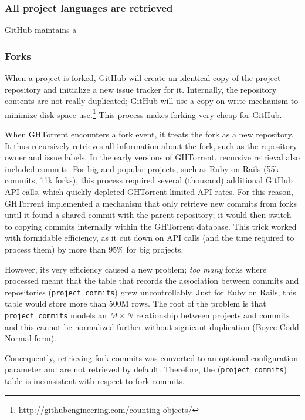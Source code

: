 \documentclass{sig-alternate}
\begin{document}
\subsubsection{All project languages are retrieved}
GitHub maintains a 


\subsubsection{Forks}

When a project is forked, GitHub will create an identical copy of the project
repository and initialize a new issue tracker for it. Internally, the repository
contents are not really duplicated; GitHub will use a copy-on-write
mechanism to minimize disk space use.\footnote{http://githubengineering.com/counting-objects/} This process makes forking very cheap for GitHub.

When GHTorrent encounters a fork event, it treats the fork as a new repository.
It thus recursively retrieves all information about the fork, such as the
repository owner and issue labels. In the early versions of
GHTorrent, recursive retrieval also included commits. For big and popular
projects, such as Ruby on Rails (55k commits, 11k forks),
this process required several (thousand) additional GitHub API calls, which
quickly depleted GHTorrent limited API rates. For this reason, GHTorrent implemented a mechanism that only retrieve new commits from forks until
it found a shared commit with the parent repository; it would then switch
to copying commits internally within the GHTorrent database. This trick worked
with formidable efficiency, as it cut down on API calls (and the time required
to process them) by more than 95\% for big projects.

However, its very efficiency caused a new problem; \emph{too many} forks where
processed meant that the table that records the association between commits and
repositories (\texttt{project\_\-commits}) grew uncontrollably. Just for Ruby on
Rails, this table would store more than 500M rows. The root of the problem
is that \texttt{project\_commits} models an $M \times N$ relationship between
projects and commits and this cannot be normalized further without signicant
duplication (Boyce-Codd Normal form).

Concequently, retrieving fork commits was converted to an optional
configuration parameter and are not retrieved by default. Therefore, the
(\texttt{project\_\-commits}) table is inconsistent with respect to
fork commits.
\end{document}
